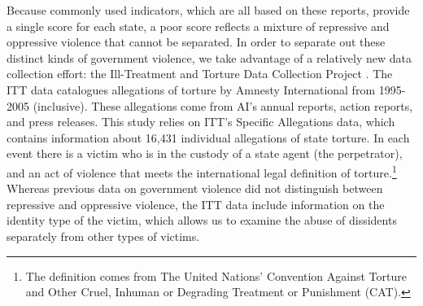 \documentclass[11pt]{article}
\begin{document}
Because commonly used indicators, which are all based on these reports, provide a single score for each state, a poor score reflects a mixture of repressive and oppressive violence that cannot be separated. In order to separate out these distinct kinds of government violence, we take advantage of a relatively new data collection effort: the Ill-Treatment and Torture Data Collection Project \citep{ConradHaglundMoore2014}. The ITT data catalogues allegations of torture by Amnesty International from 1995-2005 (inclusive). These allegations come from AI's annual reports, action reports, and press releases. This study relies on ITT's Specific Allegations data, which contains information about 16,431 individual allegations of state torture. In each event there is a victim who is in the custody of a state agent (the perpetrator), and an act of violence that meets the international legal definition of torture.\footnote{The definition comes from The United Nations' Convention Against Torture and Other Cruel, Inhuman or Degrading Treatment or Punishment (CAT).} Whereas previous data on government violence did not distinguish between repressive and oppressive violence, the ITT data include information on the identity type of the victim, which allows us to examine the abuse of dissidents separately from other types of victims. 
\end{document}

